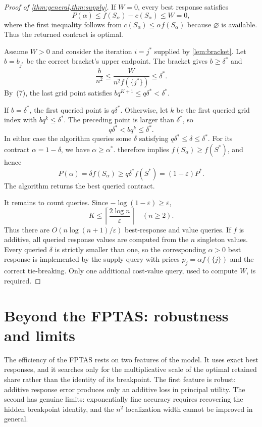 \documentclass[11pt]{article}
\newcommand{\eps}{\varepsilon}
\begin{document}
\begin{proof}[Proof of \cref{thm:general,thm:supply}]
If $W=0$, every best response satisfies
\[
P(\alpha)
\leq f(S_\alpha)-c(S_\alpha)
\leq W=0,
\]
where the first inequality follows from
$c(S_\alpha)\leq\alpha f(S_\alpha)$ because $\varnothing$ is available.
Thus the returned contract is optimal.

Assume $W>0$ and consider the iteration $i=j^*$ supplied by
\cref{lem:bracket}.  Let $b=b_{j^*}$ be the correct bracket's upper endpoint.
The bracket gives
$b\geq\delta^*$ and
\[
\frac{b}{n^2}
\leq\frac{W}{n^2f(\{j^*\})}
\leq\delta^*.                                               \tag{8}
\]
By~(7), the last grid point satisfies
$bq^{K+1}\leq q\delta^*<\delta^*$.

If $b=\delta^*$, the first queried point is $q\delta^*$.
Otherwise, let $k$ be the first queried grid index with
$bq^k\leq\delta^*$.  The preceding point is larger than $\delta^*$, so
\[
              q\delta^*<bq^k\leq\delta^*.                  \tag{9}
\]
In either case the algorithm queries some $\delta$ satisfying
$q\delta^*\leq\delta\leq\delta^*$.
For its contract $\alpha=1-\delta$, we have $\alpha\geq\alpha^*$.
 therefore implies
$f(S_\alpha)\geq f(S^*)$, and hence
\[
P(\alpha)
 =\delta f(S_\alpha)
 \geq q\delta^*f(S^*)
 =(1-\eps)P^*.
\]
The algorithm returns the best queried contract.

It remains to count queries.  Since
$-\log(1-\eps)\geq\eps$,
\[
K
\leq\left\lceil\frac{2\log n}{\eps}\right\rceil
\quad (n\geq2).
\]
Thus there are $O(n\log(n+1)/\eps)$ best-response and value queries.
If $f$ is additive, all queried response values are computed from the
$n$ singleton values.  Every queried $\delta$ is strictly smaller than one,
so the corresponding $\alpha>0$ best response is implemented by the supply
query with prices $p_j=\alpha f(\{j\})$ and the correct tie-breaking.  Only
one additional cost-value query, used to compute $W$, is required.
\end{proof}

\section{Beyond the FPTAS: robustness and limits}\label{sec:followup}

The efficiency of the FPTAS rests on two features of the model.  It uses
exact best responses, and it searches only for the multiplicative scale of
the optimal retained share rather than the identity of its breakpoint.  The
first feature is robust: additive response error produces only an additive
loss in principal utility.  The second has genuine limits: exponentially
fine accuracy requires recovering the hidden breakpoint identity, and the
$n^2$ localization width cannot be improved in general.
\end{document}
